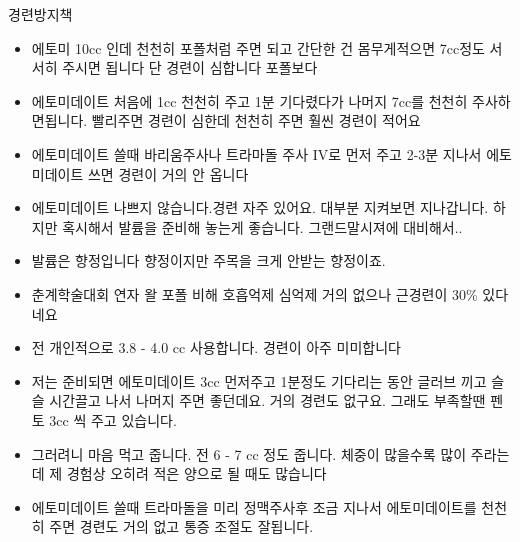\begin{commentbox}{경련방지책}
\begin{itemize}\tightlist
    \item 에토미 10cc 인데 천천히 포폴처럼 주면 되고 간단한 건 몸무게적으면 7cc정도 서서히 주시면 됩니다 단 경련이 심합니다 포폴보다
    \item 에토미데이트 처음에 1cc 천천히 주고 1분 기다렸다가 나머지  7cc를  천천히  주사하면됩니다. 빨리주면 경련이 심한데 천천히 주면 훨씬 경련이 적어요
    \item 에토미데이트 쓸때 바리움주사나 트라마돌 주사 IV로 먼저 주고 2-3분 지나서 에토미데이트 쓰면 경련이 거의 안 옵니다
    \item 에토미데이트 나쁘지 않습니다.경련 자주 있어요. 대부분 지켜보면 지나갑니다. 하지만 혹시해서 발륨을 준비해 놓는게 좋습니다. 그랜드말시져에 대비해서..
    \item 발륨은 향정입니다 향정이지만 주목을 크게 안받는 향정이죠. 
    \item 춘계학술대회 연자 왈 포폴 비해 호흡억제 심억제 거의 없으나 근경련이 30\% 있다네요
    \item 전 개인적으로 3.8 - 4.0 cc 사용합니다.  경련이 아주 미미합니다
    \item 저는 준비되면 에토미데이트 3cc 먼저주고 1분정도 기다리는 동안 글러브 끼고 슬슬 시간끌고 나서 나머지 주면 좋던데요. 거의 경련도 없구요.  그래도 부족할땐 펜토 3cc 씩 주고 있습니다.
    \item 그러려니 마음 먹고 줍니다. 전 6 - 7 cc  정도 줍니다. 체중이 많을수록 많이 주라는데 제 경험상 오히려 적은 양으로 될 때도 많습니다
    \item 에토미데이트 쓸때 트라마돌을 미리 정맥주사후 조금 지나서 에토미데이트를 천천히 주면 경련도 거의 없고 통증 조절도 잘됩니다.
\end{itemize}    
\end{commentbox}